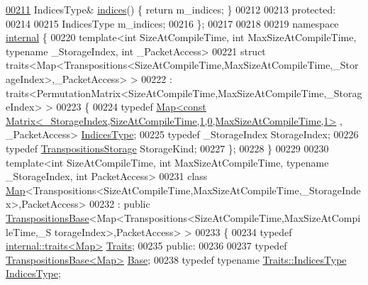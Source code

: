 \begin{DoxyCode}
\hyperlink{group___core___module_a678dfbd513871473bcd36bbc453eed8c}{00211}     IndicesType& \hyperlink{group___core___module_a678dfbd513871473bcd36bbc453eed8c}{indices}() \{ \textcolor{keywordflow}{return} m\_indices; \}
00212 
00213   \textcolor{keyword}{protected}:
00214 
00215     IndicesType m\_indices;
00216 \};
00217 
00218 
00219 \textcolor{keyword}{namespace }\hyperlink{namespaceinternal}{internal} \{
00220 \textcolor{keyword}{template}<\textcolor{keywordtype}{int} SizeAtCompileTime, \textcolor{keywordtype}{int} MaxSizeAtCompileTime, \textcolor{keyword}{typename} \_StorageIndex, \textcolor{keywordtype}{int} \_PacketAccess>
00221 \textcolor{keyword}{struct }traits<Map<Transpositions<SizeAtCompileTime,MaxSizeAtCompileTime,\_StorageIndex>,\_PacketAccess> >
00222  : traits<PermutationMatrix<SizeAtCompileTime,MaxSizeAtCompileTime,\_StorageIndex> >
00223 \{
00224   \textcolor{keyword}{typedef} 
      \hyperlink{group___core___module_class_eigen_1_1_map}{Map<const Matrix<\_StorageIndex,SizeAtCompileTime,1,0,MaxSizeAtCompileTime,1>}
      , \_PacketAccess> \hyperlink{group___core___module_class_eigen_1_1_matrix}{IndicesType};
00225   \textcolor{keyword}{typedef} \_StorageIndex StorageIndex;
00226   \textcolor{keyword}{typedef} \hyperlink{struct_eigen_1_1_transpositions_storage}{TranspositionsStorage} StorageKind;
00227 \};
00228 \}
00229 
00230 \textcolor{keyword}{template}<\textcolor{keywordtype}{int} SizeAtCompileTime, \textcolor{keywordtype}{int} MaxSizeAtCompileTime, \textcolor{keyword}{typename} \_StorageIndex, \textcolor{keywordtype}{int} PacketAccess>
00231 \textcolor{keyword}{class }\hyperlink{group___core___module_class_eigen_1_1_map}{Map}<Transpositions<SizeAtCompileTime,MaxSizeAtCompileTime,\_StorageIndex>,PacketAccess>
00232  : \textcolor{keyword}{public} \hyperlink{class_eigen_1_1_transpositions_base}{TranspositionsBase}<Map<Transpositions<SizeAtCompileTime,MaxSizeAtCompileTime,\_S
      torageIndex>,PacketAccess> >
00233 \{
00234     \textcolor{keyword}{typedef} \hyperlink{struct_eigen_1_1internal_1_1traits}{internal::traits<Map>} \hyperlink{struct_eigen_1_1internal_1_1traits_3_01_transpositions_3_01_size_at_compile_time_00_01_max_size_a3e3a58d21bfa7053a385355887ee81d}{Traits};
00235   \textcolor{keyword}{public}:
00236 
00237     \textcolor{keyword}{typedef} \hyperlink{class_eigen_1_1_transpositions_base}{TranspositionsBase<Map>} \hyperlink{class_eigen_1_1_transpositions_base}{Base};
00238     \textcolor{keyword}{typedef} \textcolor{keyword}{typename} \hyperlink{group___core___module_class_eigen_1_1_matrix}{Traits::IndicesType} \hyperlink{group___core___module_class_eigen_1_1_matrix}{IndicesType};

\end{DoxyCode}

